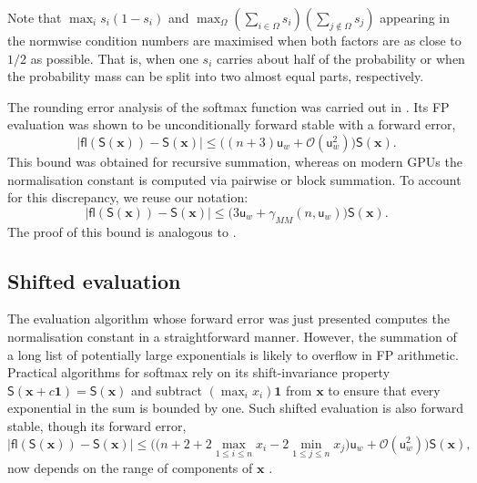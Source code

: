 \documentclass[namedate,webpdf,imanum]{ima-authoring-template}
\newcommand{\Matrix}[1]{\mathbf{#1}}
\newcommand{\One}{\Matrix{1}}
\newcommand{\Layer}[1]{\mathsf{#1}}
\newcommand{\fl}[2][]{\mathsf{fl}#1( #2 #1)}
\newcommand{\uh}{\mathsf{u}}
\newcommand{\Oh}[2][]{\mathcal{O}#1( #2 #1)}
\numberwithin{equation}{section}
\begin{document}
Note that $\max_i s_i (1 - s_i)$ and $\max_{\Omega} (\sum_{i \in \Omega} s_i) (\sum_{j \not\in \Omega} s_j)$ appearing in the normwise condition numbers are maximised when both factors are as close to $1/2$ as possible.
That is, when one $s_i$ carries about half of the probability or when the probability mass can be split into two almost equal parts, respectively.

The rounding error analysis of the softmax function was carried out in \cite{blanchard2021accurately}.
Its FP evaluation was shown to be unconditionally forward stable with a forward error,
\begin{equation*}
    |\fl{\Layer{S}(\Matrix{x})} - \Layer{S}(\Matrix{x})| \leq \big( (n+3) \uh_{w} + \Oh{\uh_{w}^2} \big) \Layer{S}(\Matrix{x}).
\end{equation*}
This bound was obtained for recursive summation, whereas on modern GPUs the normalisation constant is computed via pairwise or block summation.
To account for this discrepancy, we reuse our notation:
\begin{equation}
\label{eq:error-softmax}
    |\fl{\Layer{S}(\Matrix{x})} - \Layer{S}(\Matrix{x})| \leq \big( 3\uh_{w} + \gamma_{MM}(n,\uh_w)\big) \Layer{S}(\Matrix{x}).
\end{equation}
The proof of this bound is analogous to \cite{blanchard2021accurately}.

\subsection{Shifted evaluation}
The evaluation algorithm whose forward error was just presented computes the normalisation constant in a straightforward manner.
However, the summation of a long list of potentially large exponentials is likely to overflow in FP arithmetic.
Practical algorithms for softmax rely on its shift-invariance property $\Layer{S}(\Matrix{x} + c \One) = \Layer{S}(\Matrix{x})$ and subtract $(\max_i x_i) \One$ from $\Matrix{x}$ to ensure that every exponential in the sum is bounded by one.
Such shifted evaluation is also forward stable, though its forward error,
\begin{equation*}
    |\fl{\Layer{S}(\Matrix{x})} - \Layer{S}(\Matrix{x})| \leq \Big( \big(n+2 + 2 \max_{1 \leq i \leq n} x_i - 2 \min_{1 \leq j \leq n} x_j\big) \uh_{w} + \Oh{\uh_{w}^2} \Big) \Layer{S}(\Matrix{x}),
\end{equation*}
now depends on the range of components of $\Matrix{x}$ \citep{blanchard2021accurately}.
\end{document}
